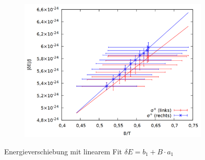 \begin{figure}
\begin{subfigure}{0.6\textwidth}
\end{subfigure}
\begin{subfigure}{0.6\textwidth}
\includegraphics[width=\textwidth]{data/zeeman/out_zeeman_neu_mitte.png}
\end{subfigure}
\caption{Energieverschiebung mit linearem Fit $\delta E = b_1 + B \cdot a_1$}
\label{fig:res_lin}
\end{figure}

